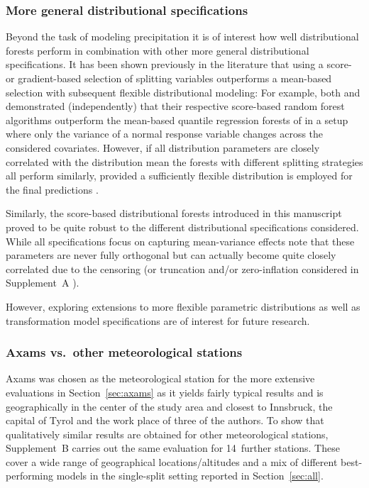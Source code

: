 \documentclass[aoas, preprint]{imsart}
\numberwithin{equation}{subsection}
\begin{document}
\subsubsection*{More general distributional specifications}

Beyond the task of modeling precipitation it is of interest how well distributional
forests perform in combination with other more general distributional specifications.
It has been shown previously in the literature that using a score- or gradient-based
selection of splitting variables outperforms a mean-based selection with subsequent
flexible distributional modeling: For example, both \citet[][Figure~2]{Athey+Tibshirani+Wager:2019}
and \citet[][Figure~1]{Hothorn+Zeileis:2017} demonstrated (independently) that their
respective score-based random forest algorithms outperform the mean-based quantile
regression forests of \cite{Meinshausen:2006} in a setup where only the variance of a normal
response variable changes across the considered covariates. However, if all distribution
parameters are closely correlated with the distribution mean the forests with different
splitting strategies all perform similarly, provided a sufficiently flexible distribution
is employed for the final predictions \citep[see][Section~7]{Hothorn+Zeileis:2017}.

Similarly, the score-based distributional forests introduced in this manuscript
proved to be quite robust to the different distributional specifications considered.
While all specifications focus on capturing mean-variance effects note that these
parameters are never fully orthogonal but can actually become quite closely correlated
due to the censoring (or truncation and/or zero-inflation considered in 
Supplement~A \citep{Schlosser+Hothorn+Stauffer:2019a}).

However, exploring extensions to more flexible parametric distributions
\citep[e.g., such as the Dagum distribution considered by][in GAMLSS-type models]{Klein+Kneib+Lang:2015}
as well as transformation model specifications \citep[e.g., as in][]{Hothorn+Zeileis:2017}
are of interest for future research.


\subsubsection*{Axams vs.~other meteorological stations}

Axams was chosen as the meteorological station for the more extensive evaluations
in Section~\ref{sec:axams} as it yields fairly typical results
and is geographically in the center of the study area and closest to
Innsbruck, the capital of Tyrol and the work place of three of the authors.
To show that qualitatively similar results are obtained for other
meteorological stations, Supplement~B \citep{Schlosser+Hothorn+Stauffer:2019b}
carries out the same evaluation for 14~further stations. These
cover a wide range of geographical locations/altitudes and a mix of
different best-performing models in the single-split setting reported in
Section~\ref{sec:all}.
\end{document}

